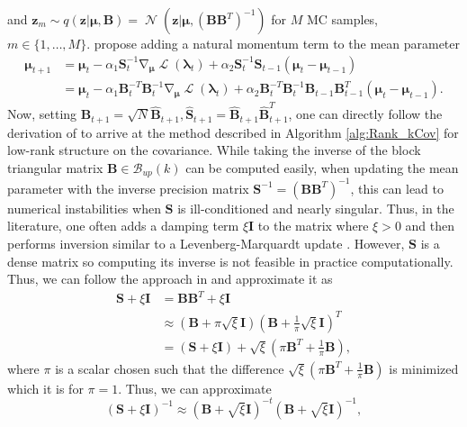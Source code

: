 \documentclass[a4paper, 11pt, oneside]{scrartcl}
\theoremstyle{break}
\DeclareMathOperator{\Normal}{\mathcal{N}}
\DeclareMathOperator{\grad}{\nabla}
\DeclareMathOperator{\ELBO}{\mathcal{L}}
\newcommand{\matr}[1]{\boldsymbol{#1}}
\newcommand{\set}[1]{\mathcal{#1}}
\numberwithin{equation}{section}
\begin{document}
				and $\matr{z}_m \sim q(\matr{z} | \matr{\mu}, \matr{B}) = \Normal(\matr{z} | \matr{\mu}, (\matr{B} \matr{B}^T)^{-1})$ for $M$ MC samples, $m \in \{1, \dots, M\}$.
				\cite{KNT+18, LSK20} propose adding a natural momentum term to the mean parameter
				\begin{align*}
					\matr{\mu}_{t+1} &= \matr{\mu}_t - \alpha_1 \matr{S}_t^{-1} \grad_{\matr{\mu}} \ELBO (\matr{\lambda}_t) + \alpha_2 \matr{S}_t^{-1} \matr{S}_{t-1} (\matr{\mu}_t - \matr{\mu}_{t-1}) \\
					&= \matr{\mu}_t - \alpha_1 \matr{B}_t^{-T} \matr{B}_t^{-1} \grad_{\matr{\mu}} \ELBO (\matr{\lambda}_t) + \alpha_2 \matr{B}_t^{-T} \matr{B}_t^{-1} \matr{B}_{t-1} \matr{B}_{t-1}^T (\matr{\mu}_t - \matr{\mu}_{t-1}).
				\end{align*}
				Now, setting $\matr{B}_{t+1} = \sqrt{N} \matr{\hat{B}}_{t+1}, \matr{\hat{S}}_{t+1} = \matr{\hat{B}}_{t+1} \matr{\hat{B}}_{t+1}^T$, one can directly follow the derivation of \cite[Sec. E.3]{LSK20} to arrive at the method described in Algorithm \ref{alg:Rank_kCov} for low-rank structure on the covariance.
				While taking the inverse of the block triangular matrix $\matr{B} \in \set{B}_{up}(k)$ can be computed easily, when updating the mean parameter with the inverse precision matrix $\matr{S}^{-1} = (\matr{B} \matr{B}^T)^{-1}$, this can lead to numerical instabilities when $\matr{S}$ is ill-conditioned and nearly singular. 
				Thus, in the literature, one often adds a damping term $\xi \matr{I}$ to the matrix where $\xi > 0$ and then performs inversion similar to a Levenberg-Marquardt update \cite{L44, M63}.
				However, $\matr{S}$ is a dense matrix so computing its inverse is not feasible in practice computationally.
				Thus, we can follow the approach in \cite[Sec. 6.3]{MG15} and approximate it as 
				\begin{align*}
					\matr{S} + \xi \matr{I} &= \matr{B} \matr{B}^T + \xi \matr{I} \\
					&\approx (\matr{B} + \pi \sqrt{\xi} \matr{I}) (\matr{B} + \frac{1}{\pi} \sqrt{\xi} \matr{I})^T \\
					&= (\matr{S} + \xi \matr{I}) + \sqrt{\xi} \left(\pi \matr{B}^T + \frac{1}{\pi} \matr{B} \right),
				\end{align*}
				where $\pi$ is a scalar chosen such that the difference $\sqrt{\xi}(\pi \matr{B}^T + \frac{1}{\pi} \matr{B})$ is minimized which it is for $\pi = 1$.
				Thus, we can approximate
				\begin{equation*}
					(\matr{S} + \xi \matr{I})^{-1} \approx (\matr{B} + \sqrt{\xi} \matr{I})^{-t} (\matr{B} + \sqrt{\xi} \matr{I})^{-1},
				\end{equation*}
\end{document}
